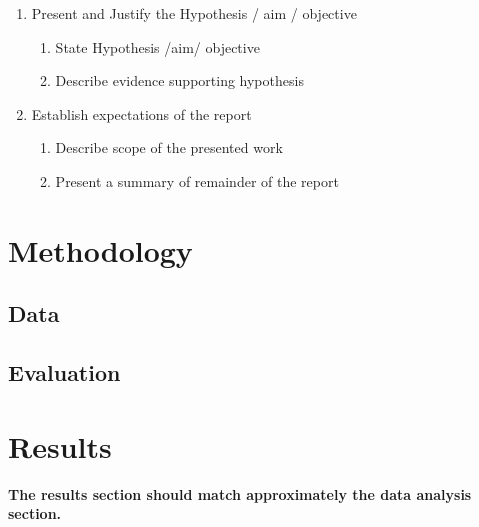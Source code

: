 \documentclass[conference]{IEEEtran}
\begin{document}
{\begin{enumerate}
\begin{enumerate}
	\end{enumerate}
\item Present and Justify the Hypothesis / aim / objective
	\begin{enumerate}
	\item State Hypothesis /aim/ objective
	\item Describe evidence supporting hypothesis
	\end{enumerate}
\item Establish expectations of the report
	\begin{enumerate}
	\item Describe scope of the presented work
	\item Present a summary of remainder of the report
	\end{enumerate}
\end{enumerate} 
}


\section{Methodology}


\subsection{Data}
\subsection{Evaluation}

\section{Results}
\textbf{The results section should match approximately the data analysis section.}\\
\end{document}
